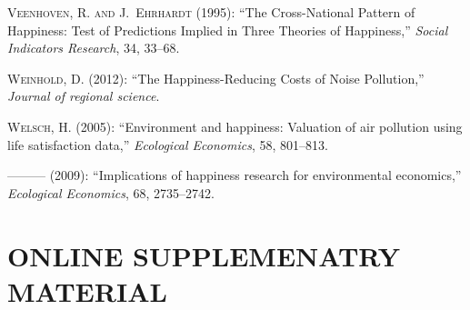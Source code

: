 \documentclass[10pt, letterpaper]{article}
\begin{document}
\begin{spacing}{1.4}
\begin{thebibliography}{36}
\textsc{Veenhoven, R. and J.~Ehrhardt} (1995): \enquote{The Cross-National
  Pattern of Happiness: Test of Predictions Implied in Three Theories of
  Happiness,} \emph{Social Indicators Research}, 34, 33--68.

\textsc{Weinhold, D.} (2012): \enquote{The Happiness-Reducing Costs of Noise
  Pollution,} \emph{Journal of regional science}.

\textsc{Welsch, H.} (2005): \enquote{Environment and happiness: Valuation of
  air pollution using life satisfaction data,} \emph{Ecological Economics}, 58,
  801--813.

---\hspace{-.1pt}---\hspace{-.1pt}--- (2009): \enquote{Implications of
  happiness research for environmental economics,} \emph{Ecological Economics},
  68, 2735--2742.

\end{thebibliography}



\newpage
\section{ONLINE SUPPLEMENATRY MATERIAL}



\end{spacing}
\end{document}
